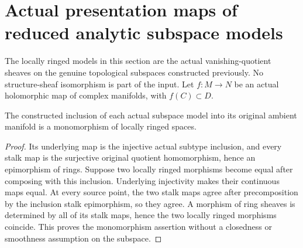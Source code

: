 \section{Actual presentation maps of reduced analytic subspace models}
\label{sec:hironaka-actual-analytic-subspace-maps}

The locally ringed models in this section are the actual vanishing-quotient
sheaves on the genuine topological subspaces constructed previously. No
structure-sheaf isomorphism is part of the input. Let $f:M\to N$ be an actual
holomorphic map of complex manifolds, with $f(C)\subset D$.

\begin{theorem}
\label{hir:actual-analytic-subspace-inclusion-mono}
\leanok
The constructed inclusion of each actual subspace model into its original
ambient manifold is a monomorphism of locally ringed spaces.
\end{theorem}
\begin{proof}
Its underlying map is the injective actual subtype inclusion, and every
stalk map is the surjective original quotient homomorphism, hence an
epimorphism of rings. Suppose two locally ringed morphisms become equal
after composing with this inclusion. Underlying injectivity makes their
continuous maps equal. At every source point, the two stalk maps agree
after precomposition by the inclusion stalk epimorphism, so they agree.
A morphism of ring sheaves is determined by all of its stalk maps, hence
the two locally ringed morphisms coincide. This proves the monomorphism
assertion without a closedness or smoothness assumption on the subspace.
\end{proof}

